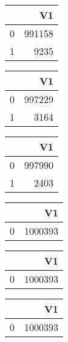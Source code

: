 \bigskip\bigskip
\centering
\begin{tabular}{rr}
  \hline
 & V1 \\ 
  \hline
0 & 991158 \\ 
  1 & 9235 \\ 
   \hline
\end{tabular}

\bigskip\bigskip
\centering
\begin{tabular}{rr}
  \hline
 & V1 \\ 
  \hline
0 & 997229 \\ 
  1 & 3164 \\ 
   \hline
\end{tabular}

\bigskip\bigskip
\centering
\begin{tabular}{rr}
  \hline
 & V1 \\ 
  \hline
0 & 997990 \\ 
  1 & 2403 \\ 
   \hline
\end{tabular}

\bigskip\bigskip
\centering
\begin{tabular}{rr}
  \hline
 & V1 \\ 
  \hline
0 & 1000393 \\ 
   \hline
\end{tabular}

\bigskip\bigskip
\centering
\begin{tabular}{rr}
  \hline
 & V1 \\ 
  \hline
0 & 1000393 \\ 
   \hline
\end{tabular}

\bigskip\bigskip
\centering
\begin{tabular}{rr}
  \hline
 & V1 \\ 
  \hline
0 & 1000393 \\ 
   \hline
\end{tabular}

